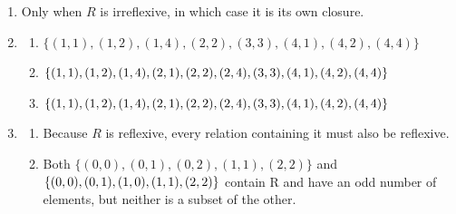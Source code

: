 \documentclass{../../cls/sig-alternate-05-2015}
\begin{document}
\begin{enumerate}
\item Only when $R$ is irreflexive, in which case it is its own closure.

\item
	\begin{enumerate}
		\item $\{(1, 1), (1, 2),
			(1, 4), (2, 2), (3, 3), (4, 1), (4, 2), (4, 4)\}$
		\item $\{(1, 1),(1, 2), (1, 4), (2, 1), (2, 2), (2, 4),\\ (3, 3), (4, 1), (4, 2),
			(4, 4)\}$
		\item $\{(1, 1), (1, 2), (1, 4), (2, 1), (2, 2), (2, 4),\\ (3, 3),
			(4, 1), (4, 2), (4, 4)\}$
	\end{enumerate}

\item 
	\begin{enumerate}
		\item Because $R$ is reflexive, every
		relation containing it must also be reflexive.
		\item Both $\{(0, 0),
			(0, 1), (0, 2), (1, 1), (2, 2)\}$ and $\{(0, 0),\\ (0, 1), (1, 0), (1, 1),
			(2, 2)\}$ contain R and have an odd number of elements, but
		neither is a subset of the other.
	\end{enumerate}
\end{enumerate}
\end{document}

